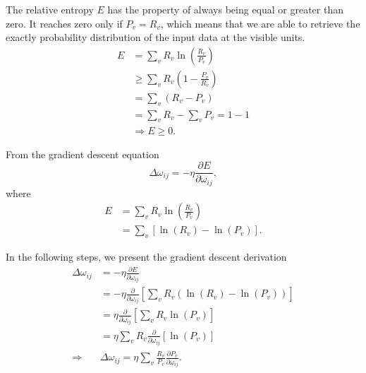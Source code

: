 The relative entropy $E$ has the property of always being equal or greater than zero.
It reaches zero only if $P_{v} = R_{v}$, which means that we are able to retrieve the exactly probability distribution of the input data at the visible units.
\begin{equation}
  \begin{split}
    E & = \sum_{v} R_{v} \ln{\left( \frac{R_{v}}{P_{v}} \right)} \\
      & \geq \sum_{v} R_{v} \left( 1 - \frac{P_{v}}{R_{v}} \right) \\
      & = \sum_{v} \left( R_{v} - P_{v} \right) \\
      & = \sum_{v} R_{v} - \sum_{v} P_{v} = 1 - 1 \\
      & \Rightarrow E \geq 0.
  \end{split}
\end{equation}

From the gradient descent equation
\begin{equation}
  \Delta \omega_{ij} = -\eta \frac{\partial E}{\partial \omega_{ij}},
  \label{eq:gradient}
\end{equation}
where
\begin{equation}
  \begin{split}
    E & = \sum_{v} R_{v} \ln{\left(\frac{R_{v}}{P_{v}}\right)} \\
      & = \sum_{v} \left[ \ln{(R_{v})} - \ln{(P_{v})} \right].
  \end{split}
  \label{eq:entropy1}
\end{equation}

In the following steps, we present the gradient descent derivation
\begin{equation}
  \begin{split}
    \Delta \omega_{ij} & = - \eta \frac{\partial E}{\partial \omega_{ij}} \\
                  & = - \eta \frac{\partial}{\partial \omega_{ij}} \left[ \sum_{v} R_{v} \left( \ln{(R_{v})} - \ln{(P_{v})} \right) \right] \\
                  & = \eta \frac{\partial}{\partial \omega_{ij}} \left[ \sum_{v} R_{v} \ln{(P_{v})} \right] \\
                  & = \eta \sum_{v} R_{v} \frac{\partial}{\partial \omega_{ij}} \left[ \ln{(P_{v})} \right] \\
                  \Rightarrow & \Delta \omega_{ij} = \eta \sum_{v} \frac{R_{v}}{P_{v}} \frac{\partial P_{v}}{\partial \omega_{ij}}.
  \end{split}
  \label{eq:grad1}
\end{equation}

